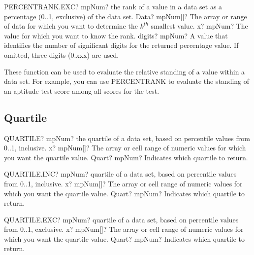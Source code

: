 \vspace{0.6cm}
\begin{mpFunctionsExtract}
	\mpWorksheetFunctionThreeNotImplemented
	{PERCENTRANK.EXC? mpNum? the rank of a value in a data set as a percentage (0..1, exclusive) of the data set.}
	{Data? mpNum[]?  The array or range of data for which you want to determine the $k^{th}$ smallest  value.}
	{x? mpNum? The value for which you want to know the rank.}
	{digits? mpNum? A value that identifies the number of significant digits for the returned percentage value. If omitted, three digits (0.xxx) are used.}
\end{mpFunctionsExtract}

\vspace{0.3cm}
These function can be used to evaluate the relative standing of a value within a data set. For example, you can use \textsf{PERCENTRANK} to evaluate the standing of an aptitude test score among all scores for the test.






\subsection{Quartile}


\begin{mpFunctionsExtract}
	\mpWorksheetFunctionTwoNotImplemented
	{QUARTILE? mpNum? the quartile of a data set, based on percentile values from 0..1, inclusive.}
	{x? mpNum[]?  The array or cell range of numeric values for which you want the quartile value.}
	{Quart? mpNum? Indicates which quartile to return.}
\end{mpFunctionsExtract}


\vspace{0.6cm}
\begin{mpFunctionsExtract}
	\mpWorksheetFunctionTwoNotImplemented
	{QUARTILE.INC? mpNum? quartile of a data set, based on percentile values from 0..1, inclusive.}
	{x? mpNum[]?  The array or cell range of numeric values for which you want the quartile value.}
	{Quart? mpNum? Indicates which quartile to return.}
\end{mpFunctionsExtract}


\vspace{0.6cm}
\begin{mpFunctionsExtract}
	\mpWorksheetFunctionTwoNotImplemented
	{QUARTILE.EXC? mpNum? quartile of a data set, based on percentile values from 0..1, exclusive.}
	{x? mpNum[]?  The array or cell range of numeric values for which you want the quartile value.}
	{Quart? mpNum? Indicates which quartile to return.}
\end{mpFunctionsExtract}

